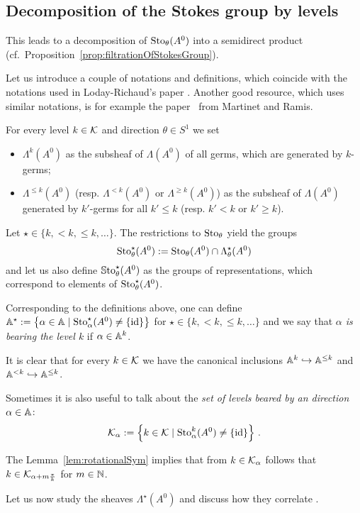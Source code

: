 \subsection{Decomposition of the Stokes group by levels}
 This leads to a decomposition of $\operatorname{Sto}_\theta(A^0)$ into a
semidirect product (cf.\ Proposition~\ref{prop:filtrationOfStokesGroup}).

Let us introduce a couple of notations and definitions, which coincide with the
notations used in Loday-Richaud's paper \cite{Loday1994}.
Another good resource, which uses similar notations, is for example the
paper~\cite[362f]{Martinet1991} from Martinet and Ramis.
\begin{notations}
  For every level $k\in\mathcal{K}$ and direction $\theta\in S^1$ we set
  \begin{itemize}
    \item $\Lambda^{k}(A^0)$ as the subsheaf of $\Lambda(A^0)$ of all germs,
      which are generated by $k$-germs;
    \item $\Lambda^{\leq k}(A^0)$ (resp. $\Lambda^{<k}(A^0)$ or
      $\Lambda^{\geq k}(A^0)$) as the subsheaf of $\Lambda(A^0)$ generated by
      $k'$-germs for all $k'\leq k$ (resp. $k'<k$ or $k'\geq k$).
  \end{itemize}
  Let $\star\in\{k,<k,\leq k,\dots\}$.
  The restrictions to $\operatorname{Sto}_\theta$ yield the groups
  \[
    \operatorname{Sto}_\theta^\star(A^0):=\operatorname{Sto}_\theta(A^0)\cap\Lambda_\theta^{\star}(A^0)
  \]
  and let us also define $\operatorname{\mathbb{S}to}^\star_\theta(A^0)$ as the groups of
  representations, which correspond to elements of  $\operatorname{Sto}^\star_\theta(A^0)$.
\end{notations}
Corresponding to the definitions above, one can define
$\mathbb{A}^\star:=\left\{\alpha\in\mathbb{A}\mid\operatorname{Sto}_\alpha^\star(A^0)\neq\{\operatorname{id}\}\right\}$
for $\star\in\{k,<k,\leq k,\dots\}$ and we say that \emph{$\alpha$ is bearing
the level $k$} if $\alpha\in\mathbb{A}^k$.
\begin{rem}
  It is clear that for every $k\in\mathcal{K}$ we have the canonical inclusions
  $\mathbb{A}^k\hookrightarrow\mathbb{A}^{\leq k}$ and $\mathbb{A}^{<k}\hookrightarrow\mathbb{A}^{\leq k}$.
\end{rem}
Sometimes it is also useful to talk about the \emph{set of levels beared by an
direction $\alpha\in\mathbb{A}$}:
\[
  \mathcal{K}_\alpha:=\left\{k\in\mathcal{K}\mid\operatorname{Sto}_\alpha^k(A^0)\neq\{\operatorname{id}\}\right\} \,.
\]
\begin{cor}
  The Lemma~\ref{lem:rotationalSym} implies that from $k\in\mathcal{K}_{\alpha}$ follows
  that $k\in\mathcal{K}_{\alpha+m\frac{\pi}{k}}$ for $m\in\mathbb{N}$.
\end{cor}
Let us now study the sheaves $\Lambda^\star(A^0)$ and discuss how they
correlate .

